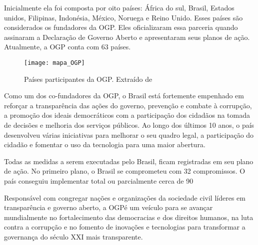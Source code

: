 Inicialmente ela foi composta por oito países: África do sul, Brasil, Estados unidos, Filipinas, Indonésia, México, Noruega e Reino Unido. Esses países são considerados os fundadores da OGP. Eles oficializaram essa parceria quando assinaram a Declaração de Governo Aberto e apresentaram seus planos de ação. Atualmente, a OGP conta com 63 países.

\graphicspath{{figuras/}}
\begin{figure}[H]
\centering
\texttt{[image: mapa\_OGP]}
\caption[Países participantes da OGP.]{Países participantes da OGP. Extraído de \cite{mapaogp} }
\label{portal}
\end{figure}

Como um dos co-fundadores da OGP, o Brasil está fortemente empenhado em reforçar a transparência das ações do governo, prevenção e combate à corrupção, a promoção dos ideais democráticos com a participação dos cidadãos na tomada de decisões e melhoria dos serviços públicos. Ao longo dos últimos 10 anos, o país desenvolveu várias iniciativas para melhorar o seu quadro legal, a participação do cidadão e fomentar o uso da tecnologia para uma maior abertura.

Todas as medidas a serem executadas pelo Brasil, ficam registradas em seu plano de ação. No primeiro plano, o Brasil se comprometeu com 32 compromissos. O país conseguiu implementar total ou parcialmente cerca de 90%

Responsável com congregar nações e organizações da sociedade civil líderes em transparência e governo aberto, a OGPé um veículo para se avançar mundialmente no fortalecimento das democracias e dos direitos humanos, na luta contra a corrupção e no fomento de inovações e tecnologias para transformar a governança do século XXI mais transparente.



